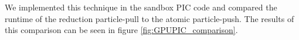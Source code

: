 




We implemented this technique in the sandbox PIC code and compared the runtime of the reduction particle-pull to the atomic particle-push. The results of this comparison can be seen in figure \ref{fig:GPUPIC_comparison}.

